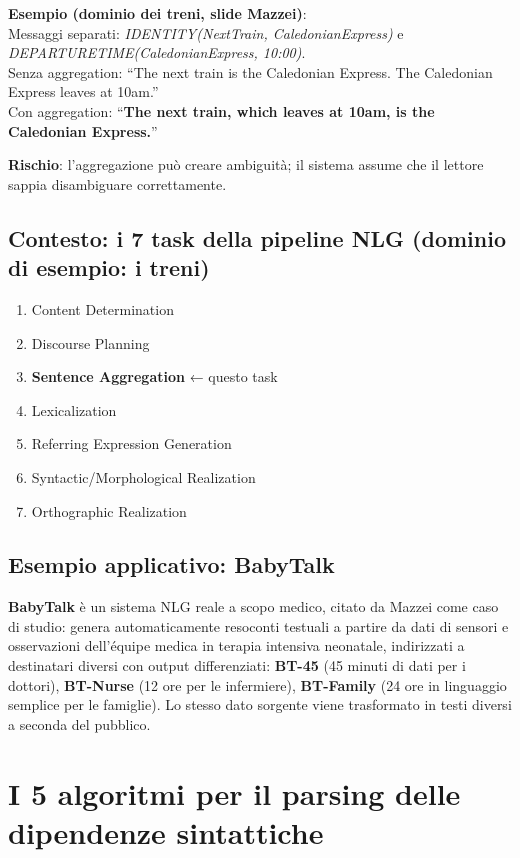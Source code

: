 \documentclass[12pt,a4paper]{article}
\begin{document}
\textbf{Esempio (dominio dei treni, slide Mazzei)}:\\
Messaggi separati: \textit{IDENTITY(NextTrain, CaledonianExpress)} e \textit{DEPARTURETIME(CaledonianExpress, 10:00)}.\\
Senza aggregation: ``The next train is the Caledonian Express. The Caledonian Express leaves at 10am.''\\
Con aggregation: ``\textbf{The next train, which leaves at 10am, is the Caledonian Express.}''

\textbf{Rischio}: l'aggregazione può creare ambiguità; il sistema assume che il lettore sappia disambiguare correttamente.

\subsection{Contesto: i 7 task della pipeline NLG (dominio di esempio: i treni)}

\begin{enumerate}[leftmargin=1.5em, label=\arabic*.]
  \item Content Determination
  \item Discourse Planning
  \item \textbf{Sentence Aggregation} ← questo task
  \item Lexicalization
  \item Referring Expression Generation
  \item Syntactic/Morphological Realization
  \item Orthographic Realization
\end{enumerate}

\subsection{Esempio applicativo: BabyTalk}

\textbf{BabyTalk} è un sistema NLG reale a scopo medico, citato da Mazzei come caso di studio: genera automaticamente resoconti testuali a partire da dati di sensori e osservazioni dell'équipe medica in terapia intensiva neonatale, indirizzati a destinatari diversi con output differenziati: \textbf{BT-45} (45 minuti di dati per i dottori), \textbf{BT-Nurse} (12 ore per le infermiere), \textbf{BT-Family} (24 ore in linguaggio semplice per le famiglie). Lo stesso dato sorgente viene trasformato in testi diversi a seconda del pubblico.

\section{I 5 algoritmi per il parsing delle dipendenze sintattiche}
\end{document}
